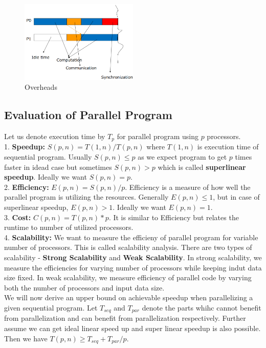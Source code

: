\documentclass{article}
\begin{document}
\begin{figure}[h]
    \centering
    \includegraphics[width=0.5\textwidth]{overheads.png}
    \caption{Overheads}
\end{figure}

\subsection*{Evaluation of Parallel Program}
Let us denote execution time by $T_p$ for parallel program using $p$ processors. \\

1. \textbf{Speedup:} $S(p,n) = T(1,n) / T(p,n)$ where $T(1,n)$ is execution time of sequential program. Usually $S(p,n) \leq p$ as we expect program to get $p$ times faster in idead case but sometimes $S(p,n) > p$ which is called \textbf{superlinear speedup}. Ideally we want $S(p,n) = p$. \\

2. \textbf{Efficiency:} $E(p,n) = S(p,n) / p$. Efficiency is a measure of how well the parallel program is utilizing the resources. Generally $E(p,n) \leq 1$, but in case of superlinear speedup, $E(p,n) > 1$. Ideally we want $E(p,n) = 1$. \\

3. \textbf{Cost:} $C(p,n) = T(p,n) * p$. It is similar to Efficiency but relates the runtime to number of utilized processors. \\

4. \textbf{Scalability:} We want to measure the efficieny of parallel program for variable number of processors. This is called scalability analysis. There are two types of scalability - \textbf{Strong Scalability} and \textbf{Weak Scalability}. In strong scalability, we measure the efficiencies for varying number of processors while keeping indut data size fixed. In weak scalability, we measure efficiency of parallel code by varying both the number of processors and input data size. \\

We will now derive an upper bound on achievable speedup when parallelizing a given sequential program. Let $T_{seq}$ and $T_{par}$ denote the parts whihc cannot benefit from parallelization and can benefit from parallelization respectively. Further assume we can get ideal linear speed up and super linear speedup is also possible. Then we have $T(p,n) \geq T_{seq} + T_{par} / p$. \\
\end{document}
